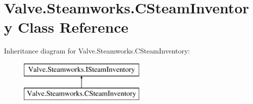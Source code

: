 \hypertarget{classValve_1_1Steamworks_1_1CSteamInventory}{}\section{Valve.\+Steamworks.\+C\+Steam\+Inventory Class Reference}
\label{classValve_1_1Steamworks_1_1CSteamInventory}
Inheritance diagram for Valve.\+Steamworks.\+C\+Steam\+Inventory\+:\begin{figure}[H]
\begin{center}
\leavevmode
\includegraphics[height=2.000000cm]{classValve_1_1Steamworks_1_1CSteamInventory}
\end{center}
\end{figure}
